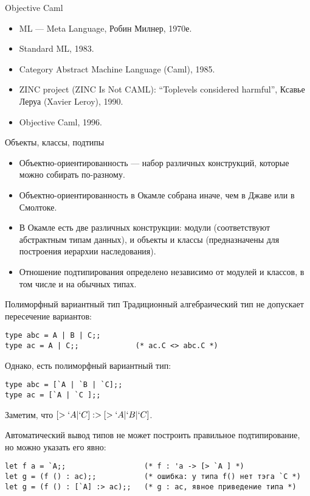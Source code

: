 \documentclass[aspectratio=169,dvipsnames,usenames]{beamer}
\begin{document}
\begin{frame}{Objective Caml}
\begin{itemize}
\item ML --- Meta Language, Робин Милнер, 1970е.
\item Standard ML, 1983.
\item Category Abstract Machine Language (Caml), 1985.
\item ZINC project (ZINC Is Not CAML): ``Toplevels considered harmful'', Ксавье Леруа (Xavier Leroy), 1990.
\item Objective Caml, 1996.
\end{itemize}
\end{frame}

\begin{frame}{Объекты, классы, подтипы}
\begin{itemize}
\item Объектно-ориентированность --- набор различных конструкций, которые можно собирать по-разному.
\item Объектно-ориентированность в Окамле собрана иначе, чем в Джаве или в Смолтоке.
\item В Окамле есть две различных конструкции: модули (соответствуют абстрактным типам данных), 
и объекты и классы (предназначены для построения иерархии наследования).
\item Отношение подтипирования определено независимо от модулей и классов, в том числе и на обычных типах.
\end{itemize}
\end{frame}

\begin{frame}[fragile]{Полиморфный вариантный тип}
Традиционный алгебраический тип не допускает пересечение вариантов:
\begin{verbatim}
type abc = A | B | C;;
type ac = A | C;;             (* ac.C <> abc.C *)
\end{verbatim}

Однако, есть полиморфный вариантный тип:
\begin{verbatim}
type abc = [`A | `B | `C];;
type ac = [`A | `C ];;
\end{verbatim}

Заметим, что $[>`A|`C] :> [>`A|`B|`C]$.

\vspace{0.5cm}
Автоматический вывод типов не может построить правильное подтипирование, но можно указать его явно:

\begin{verbatim}
let f a = `A;;                  (* f : 'a -> [> `A ] *)
let g = (f () : ac);;           (* ошибка: у типа f() нет тэга `C *)
let g = (f () : [`A] :> ac);;   (* g : ac, явное приведение типа *)
\end{verbatim}
\end{frame}
\end{document}
